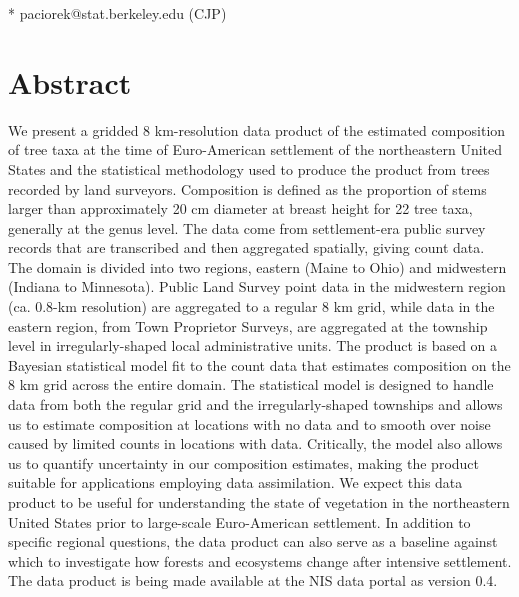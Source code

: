 \documentclass[10pt,letterpaper]{article}
\begin{document}
\begin{flushleft}



* paciorek@stat.berkeley.edu (CJP)




\end{flushleft}
\section*{Abstract}

We present a gridded 8 km-resolution data product of the estimated
composition of tree taxa at the time of Euro-American settlement of
the northeastern United States and the statistical methodology used
to produce the product from trees recorded by land surveyors. Composition
is defined as the proportion of stems larger than approximately 20
cm diameter at breast height for 22 tree taxa, generally at the genus
level. The data come from settlement-era public survey records that
are transcribed and then aggregated spatially, giving count data.
The domain is divided into two regions, eastern (Maine to Ohio) and
midwestern (Indiana to Minnesota). Public Land Survey point data in
the midwestern region (ca. 0.8-km resolution) are aggregated to a
regular 8 km grid, while data in the eastern region, from Town Proprietor
Surveys, are aggregated at the township level in irregularly-shaped
local administrative units. The product is based on a Bayesian statistical
model fit to the count data that estimates composition on the
8 km grid across the entire domain. The statistical model is designed
to handle data from both the regular grid and the irregularly-shaped
townships and allows us to estimate composition at locations with
no data and to smooth over noise caused by limited counts in locations
with data. Critically, the model also allows us to quantify uncertainty
in our composition estimates, making the product suitable for applications
employing data assimilation. We expect this data product to be useful
for understanding the state of vegetation in the northeastern United
States prior to large-scale Euro-American settlement. In addition
to specific regional questions, the data product can also serve as
a baseline against which to investigate how forests and ecosystems
change after intensive settlement. The data product is being made
available at the NIS data portal as version 0.4.
\end{document}
